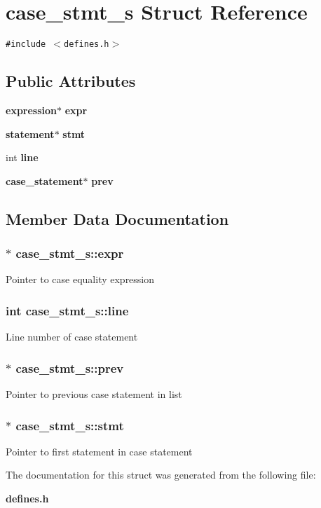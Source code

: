 \section{case\_\-stmt\_\-s  Struct Reference}
\label{structcase__stmt__s}
{\tt \#include $<$defines.h$>$}

\subsection*{Public Attributes}
\begin{CompactItemize}
\item 
{\bf expression}$\ast$ {\bf expr}
\item 
{\bf statement}$\ast$ {\bf stmt}
\item 
int {\bf line}
\item 
{\bf case\_\-statement}$\ast$ {\bf prev}
\end{CompactItemize}


\subsection{Member Data Documentation}
\subsubsection{ $\ast$ case\_\-stmt\_\-s::expr}\label{structcase__stmt__s_m0}


Pointer to case equality expression 
\subsubsection{\setlength{\rightskip}{0pt plus 5cm}int case\_\-stmt\_\-s::line}\label{structcase__stmt__s_m2}


Line number of case statement 
\subsubsection{ $\ast$ case\_\-stmt\_\-s::prev}\label{structcase__stmt__s_m3}


Pointer to previous case statement in list 
\subsubsection{ $\ast$ case\_\-stmt\_\-s::stmt}\label{structcase__stmt__s_m1}


Pointer to first statement in case statement 

The documentation for this struct was generated from the following file:\begin{CompactItemize}
\item 
{\bf defines.h}\end{CompactItemize}
